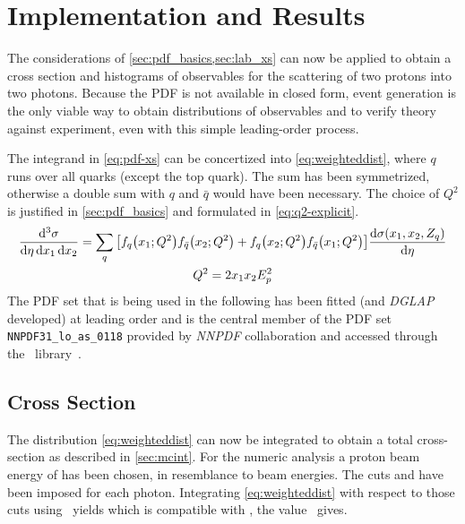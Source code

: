 \section{Implementation and Results}%
\label{sec:pdf_results}

The considerations of \cref{sec:pdf_basics,sec:lab_xs} can now be
applied to obtain a cross section and histograms of observables for
the scattering of two protons into two photons. Because the PDF is not
available in closed form, event generation is the only viable way to
obtain distributions of observables and to verify theory against
experiment, even with this simple leading-order process.

The integrand in \cref{eq:pdf-xs} can be concertized into
\cref{eq:weighteddist}, where \(q\) runs over all quarks (except the
top quark). The sum has been symmetrized, otherwise a double sum with
\(q\) and \(\bar{q}\) would have been necessary. The choice of \(Q^2\)
is justified in \cref{sec:pdf_basics} and formulated in
\cref{eq:q2-explicit}.
%
\begin{gather}
  \label{eq:weighteddist}
  \frac{\dd[3]{\sigma}}{\dd{\eta}\dd{x_1}\dd{x_2}} =
  \sum_q \qty[f_q\qty(x_1;Q^2) f_{\bar{q}}\qty(x_2;Q^2) + f_q\qty(x_2;Q^2) f_{\bar{q}}\qty(x_1;Q^2)] \dv{\sigma(x_1,
    x_2, Z_q)}{\eta} \\
  \label{eq:q2-explicit}
  Q^2 = 2x_1x_2E_p^2
\end{gather}
%
The PDF set that is being used in the following has been fitted (and
\emph{DGLAP} developed) at leading order and is the central member of
the PDF set \verb|NNPDF31_lo_as_0118| provided by \emph{NNPDF}
collaboration and accessed through the \lhapdf\
library~\cite{NNPDF:2017pd,Buckley:2015lh}.

\subsection{Cross Section}%
\label{sec:ppxs}

The distribution \cref{eq:weighteddist} can now be integrated to
obtain a total cross-section as described in \cref{sec:mcint}.  For
the numeric analysis a proton beam energy of
 has been chosen, in resemblance to
\lhc{} beam energies. The cuts \result{xs/python/pdf/eta} and
 have been imposed for each
photon. Integrating \cref{eq:weighteddist} with respect to those cuts
using \vegas\ yields \result{xs/python/pdf/my_sigma} which is
compatible with , the value
\sherpa\ gives.

